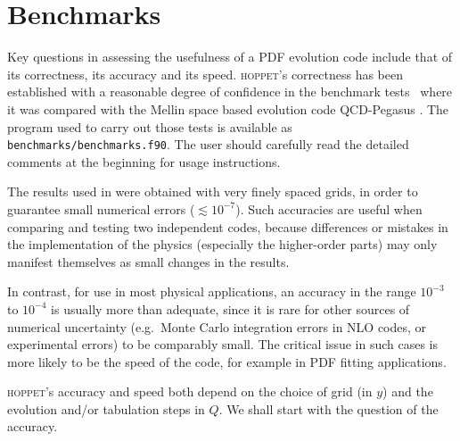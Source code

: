 \documentclass[12pt]{article}
\newcommand{\eg}{e.g.\ }
\newcommand{\hoppet}{\textsc{hoppet}\xspace}
\newcommand{\ttt}[1]{\texttt{#1}}
\begin{document}
\section{Benchmarks}
\label{sec:benchmarks}

Key questions in assessing the usefulness of a PDF evolution code include
that of its correctness, its accuracy and its speed. \hoppet's
correctness has been established with a reasonable degree of
confidence in the benchmark tests~\cite{Benchmarks} where it was
compared with the Mellin space based
evolution code QCD-Pegasus \cite{Pegasus}. 
The program used to carry out those tests
is available as \ttt{benchmarks/benchmarks.f90}. The user should
carefully read the detailed
comments at the beginning for usage instructions.

The results used in \cite{Benchmarks} were obtained with very finely
spaced grids, in order to guarantee small numerical errors ($\lesssim
10^{-7}$).  Such accuracies are useful when comparing and testing two
independent codes, because differences or mistakes in the
implementation of the physics (especially the higher-order parts) may
only manifest themselves as small changes in the results.

In contrast, for use in most physical applications, an accuracy in the
range $10^{-3}$ to $10^{-4}$ is usually more than adequate, since it
is rare for other sources of numerical uncertainty (\eg Monte Carlo
integration errors in NLO codes, or experimental errors) to be
comparably small. The critical issue in such cases is more likely to
be the speed of the code, for example in PDF fitting
applications.

\hoppet's accuracy and speed both depend on the choice of grid (in
$y$) and the evolution and/or tabulation steps in $Q$. We shall start
with the question of the accuracy.


\end{document}
